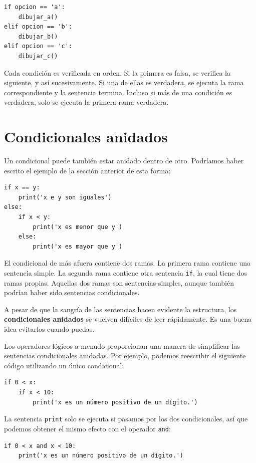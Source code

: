 \documentclass[10pt]{book}
\begin{document}
\begin{verbatim}
if opcion == 'a':
    dibujar_a()
elif opcion == 'b':
    dibujar_b()
elif opcion == 'c':
    dibujar_c()
\end{verbatim}
%
Cada condición es verificada en orden.  Si la primera es falsa,
se verifica la siguiente, y así sucesivamente.  Si una de ellas es
verdadera, se ejecuta la rama correspondiente y la sentencia
termina.  Incluso si más de una condición es verdadera, solo se ejecuta
la primera rama verdadera.


\section{Condicionales anidados}

Un condicional puede también estar anidado dentro de otro.  Podríamos haber
escrito el ejemplo de la sección anterior de esta forma:

\begin{verbatim}
if x == y:
    print('x e y son iguales')
else:
    if x < y:
        print('x es menor que y')
    else:
        print('x es mayor que y')
\end{verbatim}
%
El condicional de más afuera contiene dos ramas.  La
primera rama contiene una sentencia simple.  La segunda rama
contiene otra sentencia {\tt if}, la cual tiene dos ramas
propias.  Aquellas dos ramas son sentencias simples,
aunque también podrían haber sido sentencias condicionales.

A pesar de que la sangría de las sentencias hacen evidente la
estructura, los {\bf condicionales anidados} se vuelven difíciles de leer
rápidamente.  Es una buena idea evitarlos cuando puedas.

Los operadores lógicos a menudo proporcionan una manera de simplificar las sentencias condicionales
anidadas.  Por ejemplo, podemos reescribir el siguiente código utilizando un
único condicional:

\begin{verbatim}
if 0 < x:
    if x < 10:
        print('x es un número positivo de un dígito.')
\end{verbatim}
%
La sentencia {\tt print} solo se ejecuta si pasamos por los dos
condicionales, así que podemos obtener el mismo efecto con el operador {\tt and}:

\begin{verbatim}
if 0 < x and x < 10:
    print('x es un número positivo de un dígito.')
\end{verbatim}
\end{document}
